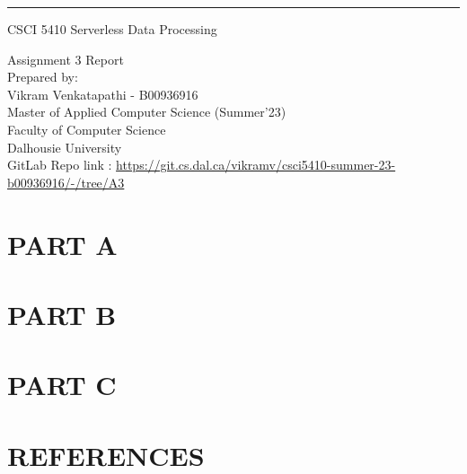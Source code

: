 \documentclass{scrreprt}
\date{\today}
\begin{document}
\begin{center}
  \rule{17cm}{5pt}\vskip1cm
  \begin{bfseries}
    \Large{CSCI 5410 Serverless Data Processing}\\
    \vspace{1.5cm}

    \vspace{1.5cm}

    \vspace{1.5cm}
    \Huge{Assignment 3 Report}\\
    \vspace{1.5cm}
    \LARGE{Prepared by: \\Vikram Venkatapathi - B00936916\\}
    \vspace{1.5cm}
    \vspace{1.5cm}
    \Large{Master of Applied Computer Science (Summer'23)\\
      Faculty of Computer Science\\
      Dalhousie University\\
      \vspace{3cm}
      GitLab Repo link : \url{https://git.cs.dal.ca/vikramv/csci5410-summer-23-b00936916/-/tree/A3}
    }
  \end{bfseries}
\end{center}



\newpage
{}

\newpage
{}
{}
\tableofcontents
\newpage
{}



\newpage
{}
\part{PART A}

\part{PART B}

\part{PART C}

\appendix
\newpage
\part{REFERENCES}

% 
% 
\end{document}
